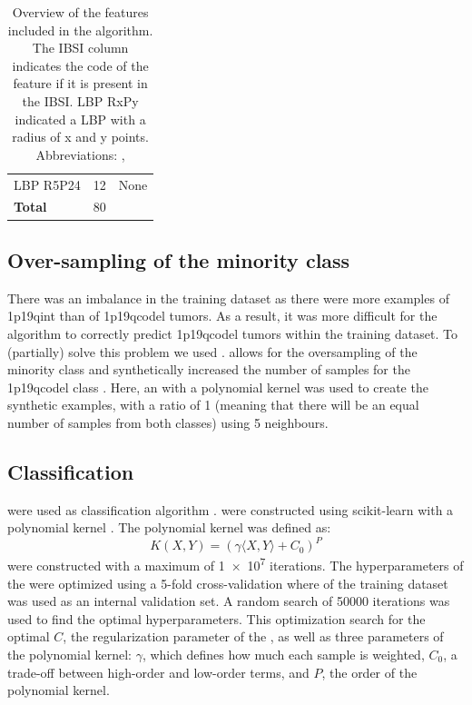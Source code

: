 \begin{subappendices}
\begin{table}
\begin{tabular}{L{3.9cm}R{0.3cm}L{5.7cm}}
        \hspace{1em}LBP R5P24 & 12 & None \\
        \addlinespace
        \textbf{Total} & 80 & \\
        \bottomrule
    \end{tabular}
    \caption{Overview of the features included in the algorithm. The \acrshort{IBSI} column indicates the code of the feature if it is present in the \acrshort{IBSI}. \acrshort{LBP} RxPy indicated a \acrshort{LBP} with a radius of x and y points. Abbreviations: , }\label{tab:LGG_1p19q_ISBI}
\end{table}

\subsection{Over-sampling of the minority class}
There was an imbalance in the training dataset as there were more examples of \acl{1p19qint} than of \acl{1p19qcodel} tumors.
As a result, it was more difficult for the algorithm to correctly predict \acl{1p19qcodel} tumors within the training dataset.
To (partially) solve this problem we used .
 allows for the oversampling of the minority class and synthetically increased the number of samples for the \acl{1p19qcodel} class \autocite{chawla2002smote}.
Here, an  with a polynomial kernel was used to create the synthetic examples, with a ratio of 1 (meaning that there will be an equal number of samples from both classes) using 5 neighbours.

\subsection{Classification}
 were used as classification algorithm \autocite{cortes1995support}.
 were constructed using scikit-learn with a polynomial kernel \autocite{pedregosa2011scikit}.
The polynomial kernel was defined as:
\begin{equation*}
    K(X, Y) = {\left(\gamma \langle X, Y \rangle + C_0\right)}^P
\end{equation*}
 were constructed with a maximum of \num{1e7} iterations.
The hyperparameters of the  were optimized using a 5-fold cross-validation where  of the training dataset was used as an internal validation set.
A random search of \num{50000} iterations was used to find the optimal hyperparameters.
This optimization search for the optimal $C$, the regularization parameter of the , as well as three parameters of the polynomial kernel: $\gamma$, which defines how much each sample is weighted, $C_0$, a trade-off between high-order and low-order terms, and $P$, the order of the polynomial kernel.


\end{subappendices}
